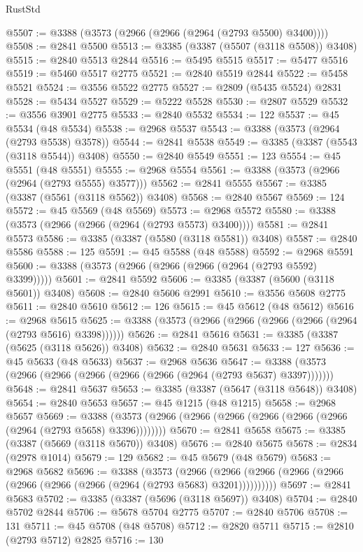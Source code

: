 \begin{lexlean}{RustStd}
\begin{coremodule}
{\begin{coremodule}
{{{{{{{{{{{{{{{{{{{{{{{{{{{{{{{{{@5507 := @3388 (@3573 (@2966 (@2966 (@2964 (@2793 @5500) @3400))))
@5508 := @2841 @5500
@5513 := @3385 (@3387 (@5507 (@3118 @5508)) @3408)
@5515 := @2840 @5513 @2844
@5516 := @5495 @5515
@5517 := @5477 @5516
@5519 := @5460 @5517 @2775
@5521 := @2840 @5519 @2844
@5522 := @5458 @5521
@5524 := @3556 @5522 @2775
@5527 := @2809 (@5435 @5524) @2831
@5528 := @5434 @5527
@5529 := @5222 @5528
@5530 := @2807 @5529
@5532 := @3556 @3901 @2775
@5533 := @2840 @5532
@5534 := 122
@5537 := @45 @5534 (@48 @5534)
@5538 := @2968 @5537
@5543 := @3388 (@3573 (@2964 (@2793 @5538) @3578))
@5544 := @2841 @5538
@5549 := @3385 (@3387 (@5543 (@3118 @5544)) @3408)
@5550 := @2840 @5549
@5551 := 123
@5554 := @45 @5551 (@48 @5551)
@5555 := @2968 @5554
@5561 := @3388 (@3573 (@2966 (@2964 (@2793 @5555) @3577)))
@5562 := @2841 @5555
@5567 := @3385 (@3387 (@5561 (@3118 @5562)) @3408)
@5568 := @2840 @5567
@5569 := 124
@5572 := @45 @5569 (@48 @5569)
@5573 := @2968 @5572
@5580 := @3388 (@3573 (@2966 (@2966 (@2964 (@2793 @5573) @3400))))
@5581 := @2841 @5573
@5586 := @3385 (@3387 (@5580 (@3118 @5581)) @3408)
@5587 := @2840 @5586
@5588 := 125
@5591 := @45 @5588 (@48 @5588)
@5592 := @2968 @5591
@5600 := @3388 (@3573 (@2966 (@2966 (@2966 (@2964 (@2793 @5592) @3399)))))
@5601 := @2841 @5592
@5606 := @3385 (@3387 (@5600 (@3118 @5601)) @3408)
@5608 := @2840 @5606 @2991
@5610 := @3556 @5608 @2775
@5611 := @2840 @5610
@5612 := 126
@5615 := @45 @5612 (@48 @5612)
@5616 := @2968 @5615
@5625 := @3388 (@3573 (@2966 (@2966 (@2966 (@2966 (@2964 (@2793 @5616) @3398))))))
@5626 := @2841 @5616
@5631 := @3385 (@3387 (@5625 (@3118 @5626)) @3408)
@5632 := @2840 @5631
@5633 := 127
@5636 := @45 @5633 (@48 @5633)
@5637 := @2968 @5636
@5647 := @3388 (@3573 (@2966 (@2966 (@2966 (@2966 (@2966 (@2964 (@2793 @5637) @3397)))))))
@5648 := @2841 @5637
@5653 := @3385 (@3387 (@5647 (@3118 @5648)) @3408)
@5654 := @2840 @5653
@5657 := @45 @1215 (@48 @1215)
@5658 := @2968 @5657
@5669 := @3388 (@3573 (@2966 (@2966 (@2966 (@2966 (@2966 (@2966 (@2964 (@2793 @5658) @3396))))))))
@5670 := @2841 @5658
@5675 := @3385 (@3387 (@5669 (@3118 @5670)) @3408)
@5676 := @2840 @5675
@5678 := @2834 (@2978 @1014)
@5679 := 129
@5682 := @45 @5679 (@48 @5679)
@5683 := @2968 @5682
@5696 := @3388
    (@3573
      (@2966 (@2966 (@2966 (@2966 (@2966 (@2966 (@2966 (@2966 (@2964 (@2793 @5683) @3201))))))))))
@5697 := @2841 @5683
@5702 := @3385 (@3387 (@5696 (@3118 @5697)) @3408)
@5704 := @2840 @5702 @2844
@5706 := @5678 @5704 @2775
@5707 := @2840 @5706
@5708 := 131
@5711 := @45 @5708 (@48 @5708)
@5712 := @2820 @5711
@5715 := @2810 (@2793 @5712) @2825
@5716 := 130
}}}}}}}}}}}}}}}}}}}}}}}}}}}}}}}}}
\end{coremodule}}
\end{coremodule}
\end{lexlean}

